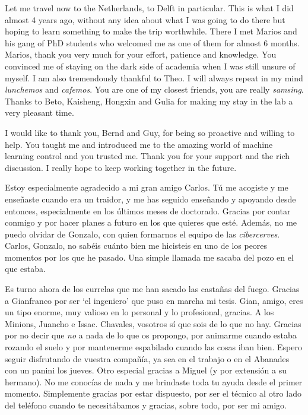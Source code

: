 \begin{acknowledgements}
Let me travel now to the Netherlands, to Delft in particular. This is what I did almost 4 years ago, without any idea about what I was going to do there but hoping to learn something to make the trip worthwhile. There I met Marios and his gang of PhD students who welcomed me as one of them for almost 6 months. Marios, thank you very much for your effort, patience and knowledge. You convinced me of staying on the dark side of academia when I was still unsure of myself. I am also tremendously thankful to Theo. I will always repeat in my mind \textit{lunchemos} and \textit{cafemos}. You are one of my closest friends, you are really \textit{samsing}. Thanks to Beto, Kaisheng, Hongxin and Gulia for making my stay in the lab a very pleasant time.

I would like to thank you, Bernd and Guy, for being so proactive and willing to help. You taught me and introduced me to the amazing world of machine learning control and you trusted me. Thank you for your support and the rich discussion. I really hope to keep working together in the future.

Estoy especialmente agradecido a mi gran amigo Carlos. Tú me acogiste y me enseñaste cuando era un traidor, y me has seguido enseñando y apoyando desde entonces, especialmente en los últimos meses de doctorado. Gracias por contar conmigo y por hacer planes a futuro en los que quieres que esté. Además, no me puedo olvidar de Gonzalo, con quien formarnos el equipo de las \textit{cibercerves}. Carlos, Gonzalo, no sabéis cuánto bien me hicisteis en uno de los peores momentos por los que he pasado. Una simple llamada me sacaba del pozo en el que estaba.

Es turno ahora de los currelas que me han sacado las castañas del fuego. Gracias a Gianfranco por ser `el ingeniero' que puso en marcha mi tesis. Gian, amigo, eres un tipo enorme, muy valioso en lo personal y lo profesional, gracias. A los Minions, Juancho e Issac. Chavales, vosotros sí que sois de lo que no hay. Gracias por no decir que \textit{no} a nada de lo que os propongo, por animarme cuando estaba rozando el suelo y por mantenerme espabilado cuando las cosas iban bien. Espero seguir disfrutando de vuestra compañía, ya sea en el trabajo o en el Abanades con un panini los jueves. Otro especial gracias a Miguel (y por extensión a su hermano). No me conocías de nada y me brindaste toda tu ayuda desde el primer momento. Simplemente gracias por estar dispuesto, por ser el técnico al otro lado del teléfono cuando te necesitábamos y gracias, sobre todo, por ser mi amigo.


\end{acknowledgements}
